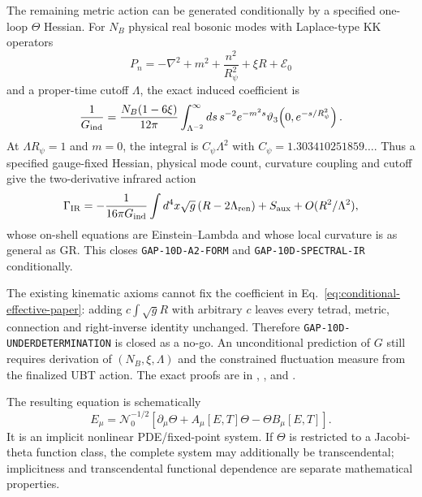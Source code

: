 \documentclass[12pt,a4paper]{article}
\theoremstyle{remark}\newtheorem{remark}[definition]{Remark}
\begin{document}
The remaining metric action can be generated conditionally by a specified
one-loop $\Theta$ Hessian.  For $N_B$ physical real bosonic modes with
Laplace-type KK operators
\begin{equation}
 P_n=-\nabla^2+m^2+\frac{n^2}{R_\psi^2}+\xi R+\mathcal E_0
\end{equation}
and a proper-time cutoff $\Lambda$, the exact induced coefficient is
\begin{equation}
 \frac1{G_{\rm ind}}
 =\frac{N_B(1-6\xi)}{12\pi}
 \int_{\Lambda^{-2}}^\infty ds\,s^{-2}e^{-m^2s}
 \vartheta_3\!\left(0,e^{-s/R_\psi^2}\right).
 \label{eq:Gind-paper}
\end{equation}
At $\Lambda R_\psi=1$ and $m=0$, the integral is
$C_\psi\Lambda^2$ with
$C_\psi=1.303410251859\ldots$.  Thus a specified gauge-fixed Hessian,
physical mode count, curvature coupling and cutoff give the two-derivative
infrared action
\begin{equation}
 \Gamma_{\rm IR}=-\frac1{16\pi G_{\rm ind}}
 \int d^4x\sqrt g\,(R-2\Lambda_{\rm ren})+S_{\rm aux}
 +O(R^2/\Lambda^2),
 \label{eq:conditional-effective-paper}
\end{equation}
whose on-shell equations are Einstein--Lambda and whose local curvature is as
general as GR.  This closes \texttt{GAP-10D-A2-FORM} and
\texttt{GAP-10D-SPECTRAL-IR} conditionally.

The existing kinematic axioms cannot fix the coefficient in
Eq.~\eqref{eq:conditional-effective-paper}: adding
$c\int\sqrt gR$ with arbitrary $c$ leaves every tetrad, metric, connection and
right-inverse identity unchanged.  Therefore
\texttt{GAP-10D-UNDERDETERMINATION} is closed as a no-go.  An unconditional
prediction of $G$ still requires derivation of $(N_B,\xi,\Lambda)$ and the
constrained fluctuation measure from the finalized UBT action.  The exact
proofs are in
,
, and
.

The resulting equation is schematically
\begin{equation}
 E_\mu=\mathcal N_0^{-1/2}
 \left[\partial_\mu\Theta+A_\mu[E,T]\Theta
 -\Theta B_\mu[E,T]\right].
 \label{eq:implicit-paper}
\end{equation}
It is an implicit nonlinear PDE/fixed-point system.  If $\Theta$ is restricted
to a Jacobi-theta function class, the complete system may additionally be
transcendental; implicitness and transcendental functional dependence are
separate mathematical properties.
\end{document}

